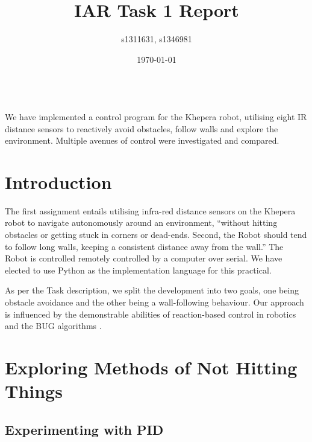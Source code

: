 \documentclass[11pt, a4paper]{article}
\renewenvironment{abstract}{%
{\mdseries\scshape\Large\abstractname}
\vspace{1em}\\
}{\par\noindent}
\begin{document}
\title{IAR Task 1 Report}
\author{s1311631, s1346981}
\date{\today}
\maketitle



\begin{abstract}
  We have implemented a control program for the Khepera robot, utilising eight IR distance
  sensors to reactively avoid obstacles, follow walls and explore the environment. Multiple 
  avenues of control were investigated and compared.
\end{abstract}



\section{Introduction}

The first assignment entails utilising infra-red distance sensors on the Khepera 
robot to navigate autonomously around an environment, ``without hitting obstacles 
or getting stuck in corners or dead-ends. Second, the Robot should tend to follow long walls, 
keeping a consistent distance away from the wall.'' The Robot is controlled remotely 
controlled by a computer over serial. We have elected to use Python as the 
implementation language for this practical.

As per the Task description, we split the development into two goals, one being obstacle 
avoidance and the other being a wall-following behaviour. Our approach is influenced 
by the demonstrable abilities of reaction-based control in robotics and the BUG 
algorithms \cite{principlesrobot}.



\section{Exploring Methods of Not Hitting Things}

\subsection{Experimenting with PID}

\end{document}
